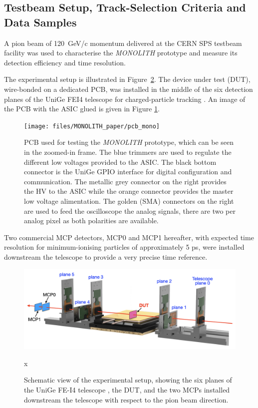 	
		\subsection{Testbeam Setup, Track-Selection Criteria and Data Samples}

		A pion beam of \SI{120}{\giga\electronvolt}/c momentum delivered at the CERN SPS testbeam facility was used to characterise the \textit{MONOLITH} prototype and measure its detection efficiency and time resolution. 

		The experimental setup is illustrated in Figure~\ref{im:MONO_Setup}. The device under test (DUT), wire-bonded on a dedicated PCB, was installed in the middle of the six detection planes of the UniGe FEI4 telescope for charged-particle tracking \cite{telescope}. An image of the PCB with the ASIC glued is given in Figure \ref{im:MONO_pcb}.
		\begin{figure}[h]
			\centering
			\texttt{[image: files/MONOLITH\_paper/pcb\_mono]}
			\caption{PCB used for testing the \textit{MONOLITH} prototype, which can be seen in the zoomed-in frame. The blue trimmers are used to regulate the different low voltages provided to the ASIC. The black bottom connector is the UniGe GPIO interface for digital configuration and communication. The metallic grey connector on the right provides the HV to the ASIC while the orange connector provides the master low voltage alimentation. The golden (SMA) connectors on the right are used to feed the oscilloscope the analog signals, there are two per analog pixel as both polarities are available. }
			\label{im:MONO_pcb} 
		\end{figure}
		
		 Two commercial MCP detectors, MCP0 and MCP1 hereafter, with expected time resolution for minimum-ionising particles of approximately 5 ps, were installed downstream the telescope to provide a very precise time reference.

		\begin{figure}[h]
			\centering
			\includegraphics[width=0.9\linewidth]{files/MONOLITH_paper/telescope.png}
			\caption{Schematic view of the experimental setup, showing the six planes of the UniGe FE-I4 telescope \cite{telescope}, the DUT, and the two MCPs installed downstream the telescope with respect to the pion beam direction.}
			\label{im:MONO_Setup} x
		\end{figure}

